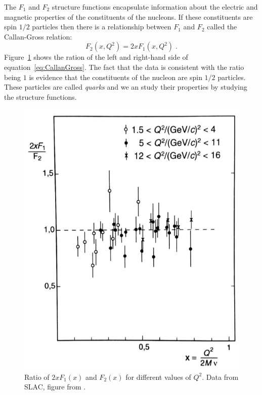 \documentclass[12pt]{article}
\begin{document}
The $F_1$ and $F_2$ structure functions encapsulate information about the electric and magnetic properties of the constituents of the nucleons. If these constituents are spin $1/2$ particles then there is a relationship between $F_1$ and $F_2$ called the Callan-Gross relation:
\begin{equation}\label{eq:CallanGross}
F_2(x,Q^2)=2xF_1(x,Q^2)\;.
\end{equation} 
Figure~\ref{fig:CallanGross} shows the ration of the left and right-hand side of equation~\ref{eq:CallanGross}. The fact that the data is consistent with the ratio being $1$ is evidence that the constituents of the nucleon are spin $1/2$ particles. These particles are called \emph{quarks} and we an study their properties by studying the structure functions.
\begin{figure}
\begin{center}
\includegraphics[scale=0.4]{images/CallanGross}
\end{center}
\caption{Ratio of $2xF_1(x)$ and $F_2(x)$ for different values of $Q^2$. Data from SLAC, figure from \cite{povh}.}\label{fig:CallanGross}
\end{figure}
\end{document}
